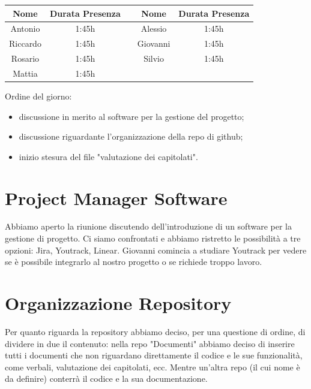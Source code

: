 \documentclass[12pt,a4paper]{article}
\begin{document}
\begin{center}
    \begin{tabular}{ |c|c|c|c|c| }
        \hline
        Nome     & Durata Presenza &  & Nome     & Durata Presenza \\
        \hline
        Antonio  & 1:45h           &  & Alessio  & 1:45h           \\
        \hline
        Riccardo & 1:45h           &  & Giovanni & 1:45h           \\
        \hline
        Rosario  & 1:45h           &  & Silvio   & 1:45h          \\
        \hline
        Mattia   & 1:45h           &  &          &                 \\
        \hline

    \end{tabular}
\end{center}

\newpage

Ordine del giorno:
\begin{itemize}
    \item discussione in merito al software per la gestione del progetto;
    \item discussione riguardante l'organizzazione della repo di github;
    \item inizio stesura del file "valutazione dei capitolati".
\end{itemize}

\section{Project Manager Software}
Abbiamo aperto la riunione discutendo dell'introduzione di 
un software per la gestione di progetto. Ci siamo confrontati 
e abbiamo ristretto le possibilità a tre opzioni: Jira, Youtrack, 
Linear. Giovanni comincia a studiare Youtrack per vedere se è 
possibile integrarlo al nostro progetto o se richiede troppo 
lavoro.

\section{Organizzazione Repository}
Per quanto riguarda la repository abbiamo deciso, per una questione di ordine, 
di dividere in due il contenuto: nella repo "Documenti" abbiamo deciso di inserire 
tutti i documenti che non riguardano direttamente il codice e le sue funzionalità,
come verbali, valutazione dei capitolati, ecc. Mentre un'altra repo (il cui nome 
è da definire) conterrà il codice e la sua documentazione.
\end{document}
